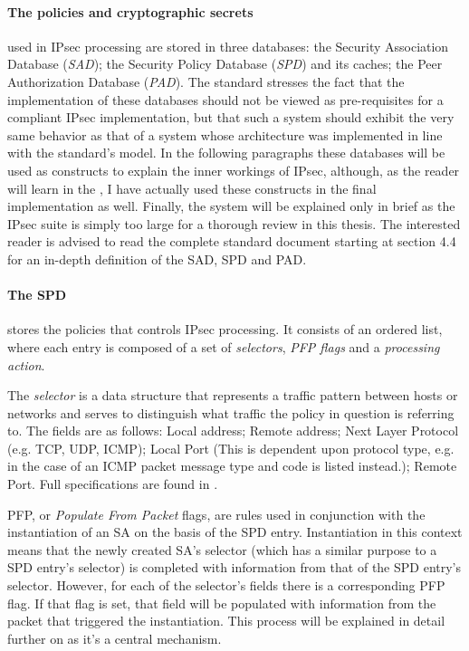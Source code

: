 \documentclass[final,a4paper,twoside,11pt,onecolumn]{report}
\begin{document}
\paragraph{The policies and cryptographic secrets} used in IPsec processing are stored in three databases: the Security Association Database (\emph{SAD}); the Security Policy Database (\emph{SPD}) and its caches; the Peer Authorization Database (\emph{PAD}). The standard stresses the fact that the implementation of these databases should not be viewed as pre-requisites for a compliant IPsec implementation, but that such a system should exhibit the very same behavior as that of a system whose architecture was implemented in line with the standard's model. In the following paragraphs these databases will be used as constructs to explain the inner workings of IPsec, although, as the reader will learn in the , I have actually used these constructs in the final implementation as well. Finally, the system will be explained only in brief as the IPsec suite is simply too large for a thorough review in this thesis. The interested reader is advised to read the complete standard document\citep{rfc4301} starting at section 4.4 for an in-depth definition of the SAD, SPD and PAD.


\paragraph{The SPD} stores the policies that controls IPsec processing. It consists of an ordered list, where each entry is composed of a set of \emph{selectors}, \emph{PFP flags} and a \emph{processing action}. 

The \emph{selector} is a data structure that represents a traffic pattern between hosts or networks and serves to distinguish what traffic the policy in question is referring to. The fields are as follows: Local address; Remote address; Next Layer Protocol (e.g. TCP, UDP, ICMP); Local Port (This is dependent upon protocol type, e.g. in the case of an ICMP packet message type and code is listed instead.); Remote Port. Full specifications are found in \citep[Section 4.4.1.1]{rfc4301}.

PFP, or \emph{Populate From Packet} flags, are rules used in conjunction with the instantiation of an SA on the basis of the SPD entry. Instantiation in this context means that the newly created SA's selector (which has a similar purpose to a SPD entry's selector) is completed with information from that of the SPD entry's selector. However, for each of the selector's fields there is a corresponding PFP flag. If that flag is set, that field will be populated with information from the packet that triggered the instantiation. This process will be explained in detail further on as it's a central mechanism.
\end{document}
